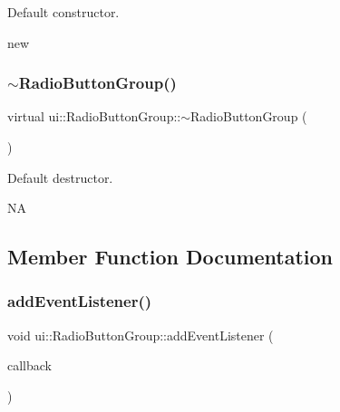 Default constructor.

new \mbox{\label{classui_1_1RadioButtonGroup_a776def3b3606e68b690e2a761d87fc84}} 
\subsubsection{\texorpdfstring{$\sim$\+Radio\+Button\+Group()}{~RadioButtonGroup()}\hspace{0.1cm}{\footnotesize\ttfamily [2/2]}}
{\footnotesize\ttfamily virtual ui\+::\+Radio\+Button\+Group\+::$\sim$\+Radio\+Button\+Group (\begin{DoxyParamCaption}{ }\end{DoxyParamCaption})\hspace{0.3cm}{\ttfamily [virtual]}}

Default destructor.

NA 

\subsection{Member Function Documentation}
\mbox{\label{classui_1_1RadioButtonGroup_a22663b5cf32d32749ced9005888e937f}} 
\subsubsection{\texorpdfstring{add\+Event\+Listener()}{addEventListener()}\hspace{0.1cm}{\footnotesize\ttfamily [1/2]}}
{\footnotesize\ttfamily void ui\+::\+Radio\+Button\+Group\+::add\+Event\+Listener (\begin{DoxyParamCaption}\item[{const \hyperlink{classui_1_1RadioButtonGroup_a8385f08613e843c5977252ed03c37e22}{cc\+Radio\+Button\+Group\+Callback} \&}]{callback }\end{DoxyParamCaption})}

